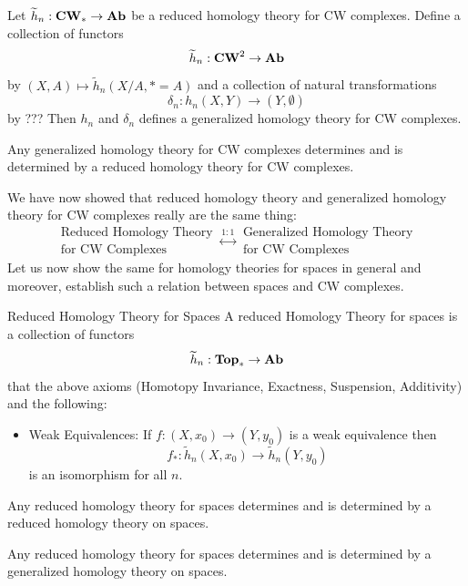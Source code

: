 \documentclass[a4paper]{article}
\begin{document}
\begin{thm}{}{} Let $\widetilde{h}_n:\bold{CW}_\ast\to\bold{Ab}$ be a reduced homology theory for CW complexes. Define a collection of functors $$\widetilde{h}_n:\bold{CW}^2\to\bold{Ab}$$ by $(X,A)\mapsto\widetilde{h}_n(X/A,\ast=A)$ and a collection of natural transformations $$\delta_n:h_n(X,Y)\to(Y,\emptyset)$$ by ??? Then $h_n$ and $\delta_n$ defines a generalized homology theory for CW complexes. 
\end{thm}

\begin{thm}{}{} Any generalized homology theory for CW complexes determines and is determined by a reduced homology theory for CW complexes. 
\end{thm}

We have now showed that reduced homology theory and generalized homology theory for CW complexes really are the same thing: $$\substack{\text{Reduced Homology Theory}\\\text{for CW Complexes}}\overset{1:1}{\longleftrightarrow}\substack{\text{Generalized Homology Theory}\\\text{for CW Complexes}}$$ Let us now show the same for homology theories for spaces in general and moreover, establish such a relation between spaces and CW complexes. 

\begin{defn}{Reduced Homology Theory for Spaces}{} A reduced Homology Theory for spaces is a collection of functors $$\widetilde{h}_n:\bold{Top}_\ast\to\bold{Ab}$$ that the above axioms (Homotopy Invariance, Exactness, Suspension, Additivity) and the following: 
\begin{itemize}
\item Weak Equivalences: If $f:(X,x_0)\to(Y,y_0)$ is a weak equivalence then $$f_\ast:\widetilde{h}_n(X,x_0)\to\widetilde{h}_n(Y,y_0)$$ is an isomorphism for all $n$. 
\end{itemize}
\end{defn}

\begin{thm}{}{} Any reduced homology theory for spaces determines and is determined by a reduced homology theory on spaces. 
\end{thm}

\begin{thm}{}{} Any reduced homology theory for spaces determines and is determined by a generalized homology theory on spaces. 
\end{thm}
\end{document}
